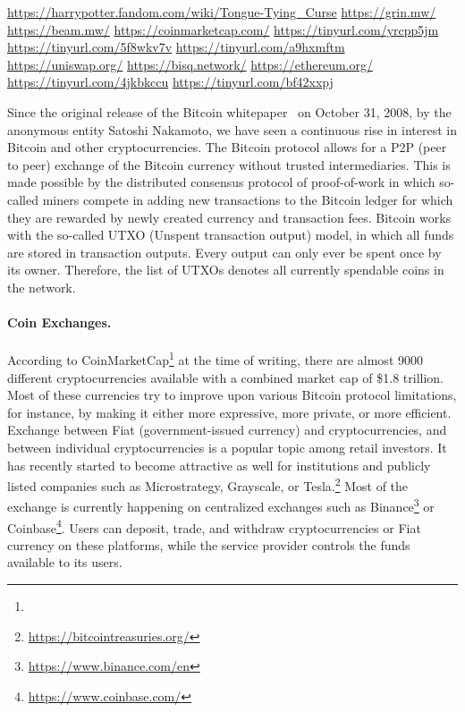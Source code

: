 \urldef\urlharrypotter\url{https://harrypotter.fandom.com/wiki/Tongue-Tying_Curse}
\urldef\urlgrin\url{https://grin.mw/}
\urldef\urlbeam\url{https://beam.mw/}
\urldef{\urlcoinmkt}\url{https://coinmarketcap.com/}
\urldef{\urlmtgox}\url{https://tinyurl.com/yrcpp5jm}
\urldef{\urlbitgrail}\url{https://tinyurl.com/5f8wkv7v}
\urldef{\urlquadriga}\url{https://tinyurl.com/a9hxmftm}
\urldef{\urluniswp}\url{https://uniswap.org/}
\urldef{\urlbisq}\url{https://bisq.network/}
\urldef{\urlethereum}\url{https://ethereum.org/}
\urldef{\urlgrinfund}\url{https://tinyurl.com/4jkbkccu}
\urldef{\urldelist}\url{https://tinyurl.com/bf42xxpj}

Since the original release of the Bitcoin whitepaper~\cite{nakamoto2019bitcoin} on October 31, 2008, by the anonymous entity Satoshi Nakamoto, we have seen a continuous rise in interest in Bitcoin and other cryptocurrencies.
The Bitcoin protocol allows for a P2P (peer to peer) exchange of the Bitcoin currency without trusted intermediaries.
This is made possible by the distributed consensus protocol of proof-of-work in which so-called miners compete in adding new transactions to the Bitcoin ledger for which they are rewarded by newly created currency and transaction fees.
Bitcoin works with the so-called UTXO (Unspent transaction output) model, in which all funds are stored in transaction outputs. Every output can only ever be spent once by its owner. Therefore, the list of UTXOs denotes all currently spendable coins in the network.

\paragraph{Coin Exchanges.} According to CoinMarketCap\footnote{\urlcoinmkt} at the time of writing, there are almost 9000 different cryptocurrencies available with a combined market cap of \$1.8 trillion.
Most of these currencies try to improve upon various Bitcoin protocol limitations, for instance, by making it either more expressive, more private, or more efficient.
Exchange between Fiat (government-issued currency) and cryptocurrencies, and between individual cryptocurrencies is a popular topic among retail investors.
It has recently started to become attractive as well for institutions and publicly listed companies such as Microstrategy, Grayscale, or Tesla.\footnote{\url{https://bitcointreasuries.org/}}
Most of the exchange is currently happening on centralized exchanges such as Binance\footnote{\url{https://www.binance.com/en}} or Coinbase\footnote{\url{https://www.coinbase.com/}}.
Users can deposit, trade, and withdraw cryptocurrencies or Fiat currency on these platforms, while the service provider controls the funds available to its users.

